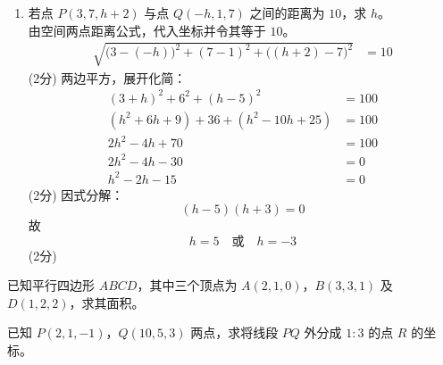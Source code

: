 \documentclass[12pt,a4paper]{exam-zh}
\newcommand{\qscore}[1]{%
    \unskip\nobreak\hfill
    \makebox[0pt][l]{\makebox[4em][r]{(#1\%)}}%
}
\begin{document}
\begin{solution}
\begin{enumerate}[label=(\alph*),leftmargin=2.4em,itemsep=1em,topsep=0.5em,parsep=0.25em]
        \item 若点 $P(3,7,h+2)$ 与点 $Q(-h,1,7)$ 之间的距离为 $10$，求 $h$。 \\
        由空间两点距离公式，代入坐标并令其等于 $10$。
        \begin{align*}
            \sqrt{\big(3-(-h)\big)^2+(7-1)^2+\big((h+2)-7\big)^2} &= 10
        \end{align*}
        \hfill (2分)
        两边平方，展开化简：
        \begin{align*}
            (3+h)^2+6^2+(h-5)^2 &= 100 \\
            (h^2+6h+9)+36+(h^2-10h+25) &= 100 \\
            2h^2-4h+70 &= 100 \\
            2h^2-4h-30 &= 0 \\
            h^2-2h-15 &= 0
        \end{align*}
        \hfill (2分)
        因式分解：
        \[
            (h-5)(h+3)=0
        \]
        故
        \[
            h=5 \quad \text{或} \quad h=-3
        \]
        \hfill (2分)
    \end{enumerate}
\end{solution}

\begin{question}[points = 12]
    \begin{questionparts}
        \item 已知平行四边形 $ABCD$，其中三个顶点为 $A(2,1,0)$，$B(3,3,1)$ 及 $D(1,2,2)$，求其面积。 \qscore{6}

        \item 已知 $P(2,1,-1)$，$Q(10,5,3)$ 两点，求将线段 $PQ$ 外分成 $1:3$ 的点 $R$ 的坐标。 \qscore{6}
    \end{questionparts}
\end{question}
\end{document}
